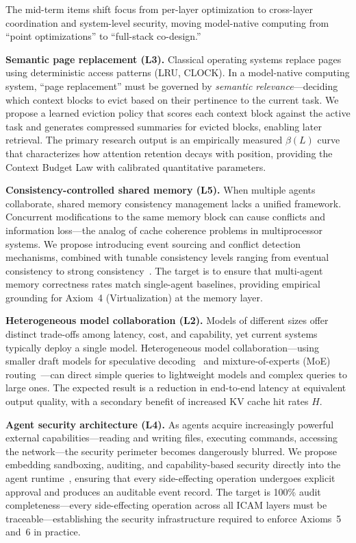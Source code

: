 \documentclass[11pt,a4paper]{article}
\begin{document}
The mid-term items shift focus from per-layer optimization to cross-layer coordination and system-level security, moving model-native computing from ``point optimizations'' to ``full-stack co-design.''

\textbf{Semantic page replacement (L3).}
Classical operating systems replace pages using deterministic access patterns (LRU, CLOCK). In a model-native computing system, ``page replacement'' must be governed by \textit{semantic relevance}---deciding which context blocks to evict based on their pertinence to the current task.
We propose a learned eviction policy that scores each context block against the active task and generates compressed summaries for evicted blocks, enabling later retrieval.
The primary research output is an empirically measured $\beta(L)$ curve that characterizes how attention retention decays with position, providing the Context Budget Law with calibrated quantitative parameters.

\textbf{Consistency-controlled shared memory (L5).}
When multiple agents collaborate, shared memory consistency management lacks a unified framework.
Concurrent modifications to the same memory block can cause conflicts and information loss---the analog of cache coherence problems in multiprocessor systems.
We propose introducing event sourcing and conflict detection mechanisms, combined with tunable consistency levels ranging from eventual consistency to strong consistency~\cite{raft2014,cap2002}.
The target is to ensure that multi-agent memory correctness rates match single-agent baselines, providing empirical grounding for Axiom~4 (Virtualization) at the memory layer.

\textbf{Heterogeneous model collaboration (L2).}
Models of different sizes offer distinct trade-offs among latency, cost, and capability, yet current systems typically deploy a single model.
Heterogeneous model collaboration---using smaller draft models for speculative decoding~\cite{leviathan2023speculative} and mixture-of-experts (MoE) routing~\cite{switch2022,mixtral2024}---can direct simple queries to lightweight models and complex queries to large ones.
The expected result is a reduction in end-to-end latency at equivalent output quality, with a secondary benefit of increased KV cache hit rates $H$.

\textbf{Agent security architecture (L4).}
As agents acquire increasingly powerful external capabilities---reading and writing files, executing commands, accessing the network---the security perimeter becomes dangerously blurred.
We propose embedding sandboxing, auditing, and capability-based security directly into the agent runtime~\cite{debenedetti2025camel,ironclaw2025,agenticsecurity2025}, ensuring that every side-effecting operation undergoes explicit approval and produces an auditable event record.
The target is 100\% audit completeness---every side-effecting operation across all ICAM layers must be traceable---establishing the security infrastructure required to enforce Axioms~5 and~6 in practice.
\end{document}
